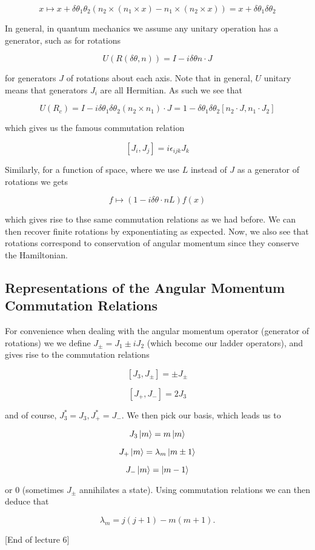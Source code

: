 \documentclass{article}
\theoremstyle{definition}
\begin{document}
$$ x \mapsto x + \delta \theta_1 \theta_2 (n_2 \times (n_1 \times x) - n_1
\times (n_2 \times x)) = x + \delta \theta_1 \delta \theta_2 $$

In general, in quantum mechanics we assume any unitary operation has a
generator, such as for rotations

$$ U(R(\delta \theta, n)) = I - i \delta \theta n \cdot J $$

for generators $J$ of rotations about each axis. Note that in general, $U$
unitary means that generators $J_i$ are all Hermitian. As such we see that

$$ U(R_c) = I - i \delta \theta_1 \delta \theta_2 (n_2 \times n_1) \cdot J = 1 -
\delta \theta_1 \delta \theta_2 [n_2 \cdot J, n_1 \cdot J_2] $$

which gives us the famous commutation relation

$$ [J_i, J_j] = i \epsilon_{ijk} J_k $$

Similarly, for a function of space, where we use $L$ instead of $J$ as a
generator of rotations we gets

$$ f \mapsto (1 - i \delta \theta \cdot n L) f(x) $$

which gives rise to thse same commutation relations as we had before. We can
then recover finite rotations by exponentiating as expected. Now, we also see
that rotations correspond to conservation of angular momentum since they
conserve the Hamiltonian.

\subsection{Representations of the Angular Momentum Commutation Relations}

For convenience when dealing with the angular momentum operator (generator of
rotations) we we define $J_{\pm} = J_1 \pm iJ_2$ (which become our ladder
operators), and gives rise to the commutation relations

$$ [J_3, J_\pm] = \pm J_\pm $$

$$ [J_+, J_-] = 2 J_3 $$

and of course, $J_3^* = J_3, J_+^* = J_-$. We then pick our basis, which leads
us to

$$ J_3 \ket{m} = m \ket{m} $$

$$ J_+ \ket{m} = \lambda_m \ket{m \pm 1} $$

$$ J_- \ket{m} = \ket{m - 1} $$

or 0 (sometimes $J_\pm$ annihilates a state). Using commutation relations we can
then deduce that

$$ \lambda_m = j(j + 1) - m(m + 1). $$

[End of lecture 6]
\end{document}
